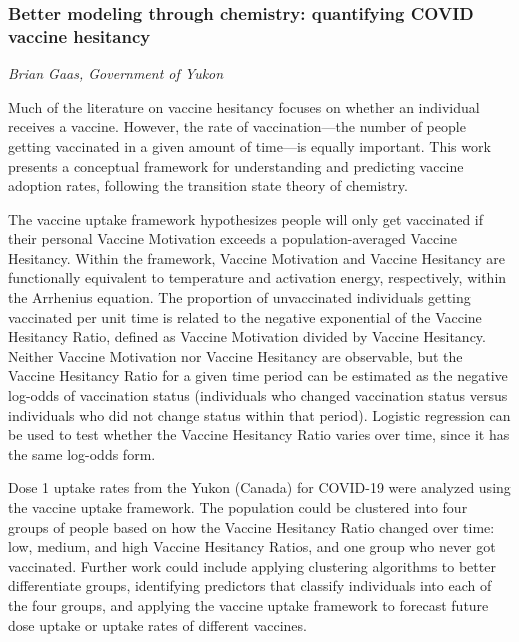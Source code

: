 \subsubsection*{Better modeling through chemistry: quantifying COVID vaccine hesitancy}
\textit{Brian Gaas, Government of Yukon}

Much of the literature on vaccine hesitancy focuses on whether an individual receives a vaccine. However, the rate of vaccination---the number of people getting vaccinated in a given amount of time---is equally important. This work presents a conceptual framework for understanding and predicting vaccine adoption rates, following the transition state theory of chemistry. 

The vaccine uptake framework hypothesizes people will only get vaccinated if their personal Vaccine Motivation exceeds a population-averaged Vaccine Hesitancy. Within the framework, Vaccine Motivation and Vaccine Hesitancy are functionally equivalent to temperature and activation energy, respectively, within the Arrhenius equation. The proportion of unvaccinated individuals getting vaccinated per unit time is related to the negative exponential of the Vaccine Hesitancy Ratio, defined as Vaccine Motivation divided by Vaccine Hesitancy. Neither Vaccine Motivation nor Vaccine Hesitancy are observable, but the Vaccine Hesitancy Ratio for a given time period can be estimated as the negative log-odds of vaccination status (individuals who changed vaccination status versus individuals who did not change status within that period). Logistic regression can be used to test whether the Vaccine Hesitancy Ratio varies over time, since it has the same log-odds form. 

Dose 1 uptake rates from the Yukon (Canada) for COVID-19 were analyzed using the vaccine uptake framework. The population could be clustered into four groups of people based on how the Vaccine Hesitancy Ratio changed over time: low, medium, and high Vaccine Hesitancy Ratios, and one group who never got vaccinated. Further work could include applying clustering algorithms to better differentiate groups, identifying predictors that classify individuals into each of the four groups, and applying the vaccine uptake framework to forecast future dose uptake or uptake rates of different vaccines.